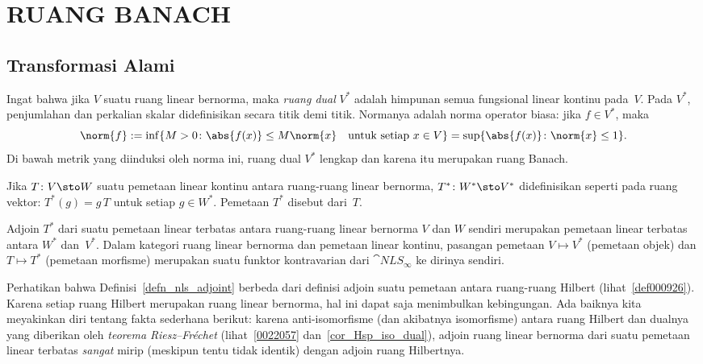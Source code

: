 \chapter{RUANG BANACH}

\section{Transformasi Alami}
 Ingat bahwa jika $V$ suatu ruang linear bernorma, maka
\emph{ruang dual} $V^*$ adalah himpunan semua fungsional linear kontinu pada~$V$.  Pada $V^*$, penjumlahan dan
perkalian skalar didefinisikan secara titik demi titik. Normanya adalah norma operator biasa: jika $f \in V^*$, maka
 \[ \norm{f} := \inf\{M > 0\colon \abs{f(x)} \le M\norm{x}\quad \text{untuk setiap $x \in V$}\} = \sup\{\abs{f(x)}\colon \norm{x} \le 1\}. \]
Di bawah metrik yang diinduksi oleh norma ini, ruang dual $V^*$ lengkap dan karena itu merupakan ruang Banach.

\begin{defn}\label{defn_nls_adjoint} Jika $T\colon V \sto W$ suatu pemetaan linear kontinu antara ruang-ruang linear bernorma,
$T^*\colon W^* \sto V^*$ didefinisikan seperti pada ruang vektor: $T^*(g) = g\,T$ untuk setiap
$g \in W^*$.  Pemetaan $T^*$ disebut
 dari~$T$.
\end{defn}

\begin{exam}\label{exam_dual_functor} Adjoin $T^*$ dari suatu pemetaan linear terbatas antara ruang-ruang linear bernorma $V$ dan
$W$ sendiri merupakan pemetaan linear terbatas antara $W^*$ dan~$V^*$. Dalam kategori ruang linear bernorma dan pemetaan linear
kontinu, pasangan pemetaan $V \mapsto V^*$ (pemetaan objek) dan $T \mapsto T^*$ (pemetaan morfisme) merupakan suatu funktor
kontravarian dari $\cat{NLS_\infty}$ ke dirinya sendiri.
\end{exam}

Perhatikan bahwa Definisi~\ref{defn_nls_adjoint} berbeda dari definisi adjoin suatu pemetaan
antara ruang-ruang Hilbert (lihat~\ref{def000926}).  Karena setiap ruang Hilbert merupakan ruang linear bernorma, hal ini dapat saja
menimbulkan kebingungan.  Ada baiknya kita meyakinkan diri tentang fakta sederhana berikut: karena anti-isomorfisme (dan akibatnya
isomorfisme) antara ruang Hilbert dan dualnya yang diberikan oleh \emph{teorema Riesz--Fr\'echet} (lihat~\ref{0022057}
dan~\ref{cor_Hsp_iso_dual}), adjoin ruang linear bernorma dari suatu pemetaan linear terbatas \emph{sangat} mirip (meskipun
tentu tidak identik) dengan adjoin ruang Hilbertnya.

